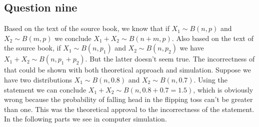 \documentclass[12pt, a4paper]{book}
\begin{document}
\clearpage

\subsection*{Question nine}

Based on the text of the source book, we know that if $X_1 \sim B(n, p)$ and $X_2 \sim B(m, p)$ we conclude
$X_1 + X_2 \sim B(n+m, p)$. Also based on the text of the source book, if $X_1 \sim B(n, p_1)$ and
$X_2 \sim B(n, p_2)$ we have $X_1+X_2 \sim B(n, p_1+p_2)$. But the latter doesn't seem true.
The incorrectness of that could be shown with both theoretical approach and simulation.
Suppose we have two distributions $X_1 \sim B(n, 0.8)$ and $X_2 \sim B(n, 0.7)$. Using the statement
we can conclude $X_1+X_2 \sim B(n, 0.8+0.7=1.5)$, which is obviously wrong because the probability
of falling head in the flipping toss can't be greater than one. This was the theoretical
approval to the incorrectness of the statement. In the following parts we see in computer simulation.
\end{document}
